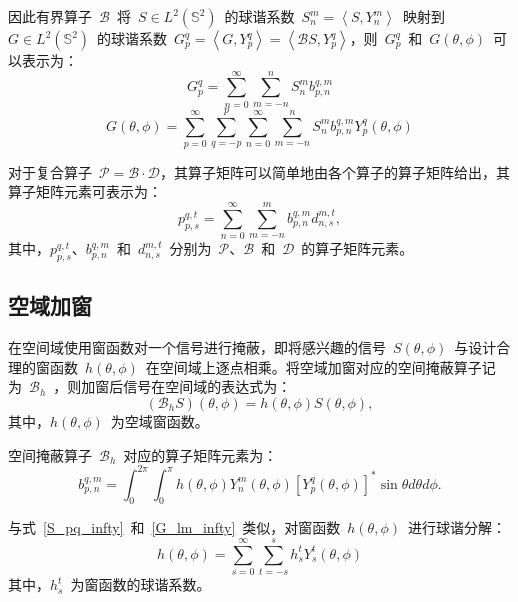 因此有界算子~$\mathcal{B}$~将~$S\in L^{2}\left(\mathbb{S}^{2}\right)$~的球谐系数~$S_ {n}^{m}=\left< S, Y_{n}^{m}\right> $~映射到~$G \in L^{2}\left(\mathbb{S}^{2}\right)$~的球谐系数~$G_{p}^{q} = \left<G,Y_{p}^{q}\right> = \left<\mathcal{B}S,Y_{p}^{q}\right>$，则~$G_{p}^{q} $~和~$G(\theta,\phi)$~可以表示为：
\begin{equation}\label{eq.G_lm}
G_{p}^{q}  = \sum_{n=0}^{\infty}\sum_{m=-n}^{n} S_{n}^{m} b_{p,n}^{q,m}
\end{equation}
\begin{equation}
G(\theta,\phi) = \sum_{p=0}^{\infty} \sum_{q=-p}^{p}\sum_{n=0}^{\infty}\sum_{m=-n}^{n} S_{n}^{m} b_{p,n}^{q,m} Y_{p}^{q}(\theta,\phi)
\end{equation}

对于复合算子~$\mathcal{P = B \cdot D }$，其算子矩阵可以简单地由各个算子的算子矩阵给出，其算子矩阵元素可表示为：
\begin{equation}
p_{p,s}^{q,t} = \sum_{n=0}^{\infty} \sum_{m=-n}^{m} b_{p,n}^{q,m} d_{n,s}^{m,t},
\end{equation}
其中，$p_{p,s}^{q,t}$、$b_{p,n}^{q,m}$~和~$d_{n,s}^{m,t}$~分别为~$\mathcal{P}$、$\mathcal{B}$~和~$\mathcal{D}$~的算子矩阵元素。

\subsection{空域加窗}\label{subsec.Addwindow}
在空间域使用窗函数对一个信号进行掩蔽，即将感兴趣的信号~$S(\theta,\phi)$~与设计合理的窗函数~$h(\theta,\phi)$~在空间域上逐点相乘。将空域加窗对应的空间掩蔽算子记为~$\mathcal{B}_{h}$~，则加窗后信号在空间域的表达式为：
\begin{equation}
\left( \mathcal{B}_{h} S\right)(\theta,\phi) = h(\theta,\phi)S(\theta,\phi),
\end{equation}
其中，$h(\theta,\phi)$~为空域窗函数。

空间掩蔽算子~$\mathcal{B}_{h}$~对应的算子矩阵元素为：
\begin{equation}
b_{p,n}^{q,m} = \int_{0}^{2\pi}\int _{0}^{\pi} h(\theta,\phi)Y_{n}^{m}(\theta,\phi) \left[Y_{p}^{q}(\theta,\phi) \right]^{*}\sin\theta d\theta d\phi.
\end{equation}


与式~\eqref{S_pq_infty}~和~\eqref{G_lm_infty}~类似，对窗函数~$h(\theta,\phi)$~进行球谐分解：
\begin{equation}\label{h_st_infty}
h(\theta,\phi) = \sum_{s=0}^{\infty} \sum_{t=-s}^{s} h_{s}^{t} Y_{s}^{t}(\theta,\phi)
\end{equation}
其中，$h_{s}^{t}$~为窗函数的球谐系数。

